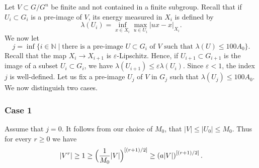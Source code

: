 \documentclass[JEP,XML,SOM,Unicode, NoEqCountersInSection,published]{cedram}
\theoremstyle{plain}
\theoremstyle{definition}
\begin{document}
Let $V\subset G/G^n$ be finite and not contained in a finite subgroup.
Recall that if $U_i \subset G_i$ is a pre-image of $V$, its energy measured in $X_i$ is defined by
\begin{equation*}
\lambda(U_i)= \inf_{x\in X_i} \max_{u\in U_i} |ux-x|_{X_i}.
\end{equation*}
We now let
\begin{equation}
\label{eqn: choose j}
j=\inf\{ i \in \mathbb N \mid \text{there is a pre-image $U \subset G_i$ of $V$ such that } \lambda(U)\leqslant 100 A_0\}.
\end{equation}
Recall that the map $X_i \to X_{i+1}$ is $\varepsilon$-Lipschitz.
Hence, if $U_{i+1} \subset G_{i+1}$ is the image of a subset $U_i \subset G_i$, we have $\lambda(U_{i+1}) \leqslant \varepsilon \lambda (U_i)$.
Since $\varepsilon < 1$, the index $j$ is well-defined.
Let us fix a pre-image $U_j$ of $V$ in $G_j$ such that $\lambda(U_j)\leqslant 100 A_0$.
We now distinguish two cases.

\subsubsection*{Case 1}
Assume that $j = 0$.
It follows from our choice of $M_0$, that $|V | \leq |U_0| \leq M_0$.
Thus for every $r \geq 0$ we have
\begin{equation*}
|V^r|
\geq 1
\geq \Bigl(\frac 1{M_0} |V|\Bigr)^{[(r+1)/2]}
\geq \left(a |V|\right)^{[(r+1)/2]}.
\end{equation*}
\end{document}
